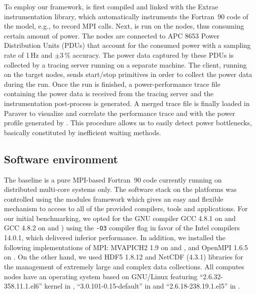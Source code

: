 To employ our  framework, \cosmoart is first compiled  and linked with
the  Extrae instrumentation  library, which  automatically instruments
the Fortran~90  code of the model,  e.g., to record  MPI calls.  Next,
\cosmoart  is run  on the  nodes, thus  consuming certain  amount of
power. The  nodes are connected  to APC 8653 Power  Distribution Units
(PDUs) that account  for the consumed   power with  a sampling rate of
1\,Hz and $\pm3\,\%$ accuracy. The power data captured by  these PDUs is collected by a \pmlib
tracing server running  on a separate machine. The  client, running on
the target nodes, sends start/stop  primitives in order to collect the
power  data during  the \cosmoart  run. Once  the run  is  finished, a
power-performance  trace file  containing the  power data  is received
from  the  tracing  server  and the  instrumentation  post-process  is
generated.  A  merged trace  file  is  finally  loaded in  Paraver  to
visualize  and correlate  the  performance trace  and  with the  power
profile  generated by \cosmoart.  This procedure  allows us  to easily
detect power bottlenecks, basically constituted by inefficient waiting
methods.

\subsection{Software environment}
\label{subsec:3.2}

The \cosmoart  baseline is a pure MPI-based  Fortran~90 code currently
running on distributed multi-core systems only.  The software stack on
the platforms  was controlled using the modules  framework which gives
an  easy and  flexible  mechanism to  access  to all  of the  provided
compilers, tools  and applications.  For our  initial benchmarking, we
opted for the GNU compiler GCC 4.8.1 on \monch and GCC 4.8.2 on \pilat
and  \tinto)  using  the \texttt{-O3}  compiler  flag  in  favor of  the  Intel
compilers 14.0.1, which  delivered inferior performance.  In addition,
we  installed the following  implementations of  MPI: MVAPICH2  1.9 on
\monch and \pilat, and OpenMPI 1.6.5  on \tinto. On the other hand, we
used HDF5  1.8.12 and NetCDF  (4.3.1) libraries for the  management of
extremely large and complex data collections.  All computes nodes have
an     operating    system     based     on    GNU/Linux     featuring
``2.6.32-358.11.1.el6'' kernel  in \monch, ``3.0.101-0.15-default'' in
\pilat and ``2.6.18-238.19.1.el5'' in \tinto.

